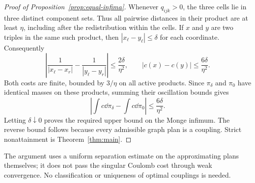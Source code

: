\begin{proof}[Proof of Proposition~\ref{prop:equal-infima}]
Whenever \(q_{ijk}>0\), the three cells lie in three distinct component
sets. Thus all pairwise distances in their product are at least
\(\eta\), including after the redistribution within the cells. If
\(x\) and \(y\) are two triples in the same such product, then
\(|x_\ell-y_\ell|\le\delta\) for each coordinate. Consequently
\[
 \left|\frac1{|x_\ell-x_r|}-\frac1{|y_\ell-y_r|}\right|
 \le\frac{2\delta}{\eta^2},
 \qquad |c(x)-c(y)|\le\frac{6\delta}{\eta^2}.
\]
Both costs are finite, bounded by \(3/\eta\) on all active products.
Since \(\pi_\delta\) and \(\pi_0\) have identical masses on these
products, summing their oscillation bounds gives
\[
 \left|\int c\dd\pi_\delta-\int c\dd\pi_0\right|
 \le\frac{6\delta}{\eta^2}.
\]
Letting \(\delta\downarrow0\) proves the required upper bound on the
Monge infimum. The reverse bound follows because every admissible graph
plan is a coupling. Strict nonattainment is Theorem~\ref{thm:main}.
\end{proof}

The argument uses a uniform separation estimate on the approximating
plans themselves; it does not pass the singular Coulomb cost through
weak convergence. No classification or uniqueness of optimal couplings
is needed.

